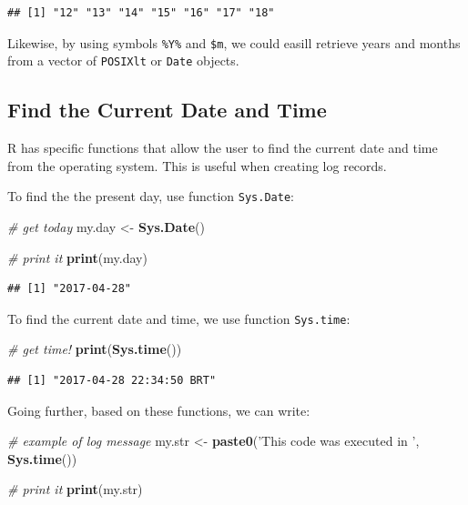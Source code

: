 \documentclass[11pt,]{book}
\newenvironment{Shaded}{\begin{snugshade}}{\end{snugshade}}
\newcommand{\KeywordTok}[1]{\textcolor[rgb]{0.27,0.27,0.27}{\textbf{#1}}}
\newcommand{\StringTok}[1]{\textcolor[rgb]{0.5,0.5,0.5}{#1}}
\newcommand{\CommentTok}[1]{\textcolor[rgb]{0.56,0.35,0.01}{\textit{#1}}}
\newcommand{\NormalTok}[1]{#1}
\begin{document}
\begin{verbatim}
## [1] "12" "13" "14" "15" "16" "17" "18"
\end{verbatim}

Likewise, by using symbols \texttt{\%Y\%} and \texttt{\$m}, we could
easill retrieve years and months from a vector of \texttt{POSIXlt} or
\texttt{Date} objects.

\subsection{Find the Current Date and
Time}\label{find-the-current-date-and-time}

R has specific functions that allow the user to find the current date
and time from the operating system. This is useful when creating log
records.

To find the the present day, use function \texttt{Sys.Date}:

\begin{Shaded}
\begin{Highlighting}[]
\CommentTok{# get today}
\NormalTok{my.day <-}\StringTok{ }\KeywordTok{Sys.Date}\NormalTok{()}

\CommentTok{# print it}
\KeywordTok{print}\NormalTok{(my.day)}
\end{Highlighting}
\end{Shaded}

\begin{verbatim}
## [1] "2017-04-28"
\end{verbatim}

To find the current date and time, we use function \texttt{Sys.time}:

\begin{Shaded}
\begin{Highlighting}[]
\CommentTok{# get time!}
\KeywordTok{print}\NormalTok{(}\KeywordTok{Sys.time}\NormalTok{())}
\end{Highlighting}
\end{Shaded}

\begin{verbatim}
## [1] "2017-04-28 22:34:50 BRT"
\end{verbatim}

Going further, based on these functions, we can write:

\begin{Shaded}
\begin{Highlighting}[]
\CommentTok{# example of log message}
\NormalTok{my.str <-}\StringTok{ }\KeywordTok{paste0}\NormalTok{(}\StringTok{'This code was executed in '}\NormalTok{, }\KeywordTok{Sys.time}\NormalTok{())}

\CommentTok{# print it}
\KeywordTok{print}\NormalTok{(my.str)}
\end{Highlighting}
\end{Shaded}
\end{document}

